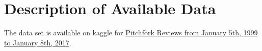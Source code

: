 \documentclass{article}
\begin{document}
\section{Description of Available
Data}\label{description-of-available-data}

The data set is available on kaggle for
\href{https://www.kaggle.com/nolanbconaway/pitchfork-data}{Pitchfork
Reviews from January 5th, 1999 to January 8th, 2017}.



\end{document}
